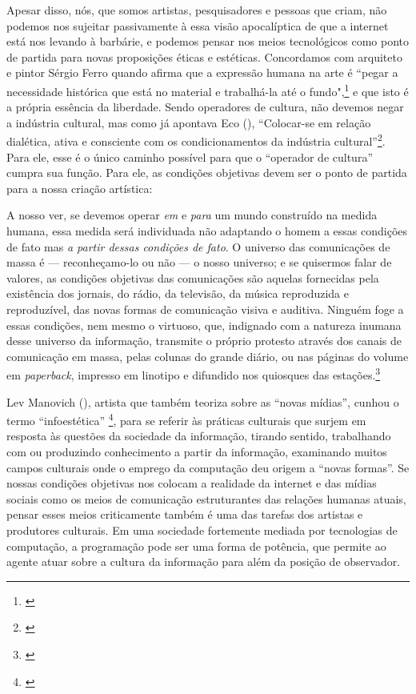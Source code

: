 Apesar disso, nós, que somos artistas, pesquisadores e pessoas que criam, não podemos nos sujeitar passivamente à essa visão apocalíptica de que a internet está nos levando à barbárie, e podemos pensar nos meios tecnológicos como ponto de partida para novas proposições éticas e estéticas. Concordamos com arquiteto e pintor Sérgio Ferro quando afirma que a expressão humana na arte é ``pegar a necessidade histórica que está no material e trabalhá-la até o fundo",\footnote{\cite{FerroSergio2002}} e que isto é a própria essência da liberdade. Sendo operadores de cultura, não devemos negar a indústria cultural, mas como já apontava Eco (\citeyear{Eco1970}), ``Colocar-se em relação dialética, ativa e consciente com os condicionamentos da indústria cultural''\footnote{\cite[14]{Eco1970}}. Para ele, esse é o único caminho possível para que o ``operador de cultura'' cumpra sua função. Para ele, as condições objetivas devem ser o ponto de partida para a nossa criação artística: 



\begin{citacao}
A nosso ver, se devemos operar \emph{em} e \emph{para} um mundo construído na medida humana, essa medida será individuada não adaptando o homem a essas condições de fato mas \emph{a partir dessas condições de fato}. O universo das comunicações de massa é --- reconheçamo-lo ou não --- o nosso universo; e se quisermos falar de valores, as condições objetivas das comunicações são aquelas fornecidas pela existência dos jornais, do rádio, da televisão, da música reproduzida e reproduzível, das novas formas de comunicação visiva e auditiva. Ninguém foge a essas condições, nem mesmo o virtuoso, que, indignado com a natureza inumana desse universo da informação, transmite o próprio protesto através dos canais de comunicação em massa, pelas colunas do grande diário, ou nas páginas do volume em \emph{paperback}, impresso em linotipo e difundido nos quiosques das estações.\footnote{\cite[13]{Eco1970}}

\end{citacao}

 Lev Manovich (\citeyear{Manovich2008}), artista que também teoriza sobre as ``novas mídias'', cunhou o termo ``infoestética'' \footnote{\cite{Manovich2008}}, para se referir às práticas culturais que surjem em resposta às questões da sociedade da informação, tirando sentido, trabalhando com ou produzindo conhecimento a partir da informação, examinando muitos campos culturais onde o emprego da computação deu origem a ``novas formas''. Se nossas condições objetivas nos colocam a realidade da internet e das mídias sociais como os meios de comunicação estruturantes das relações humanas atuais, pensar esses meios criticamente também é uma das tarefas dos artistas e produtores culturais. Em uma sociedade fortemente mediada por tecnologias de computação, a programação pode ser uma forma de potência, que permite ao agente atuar sobre a cultura da informação para além da posição de observador.

